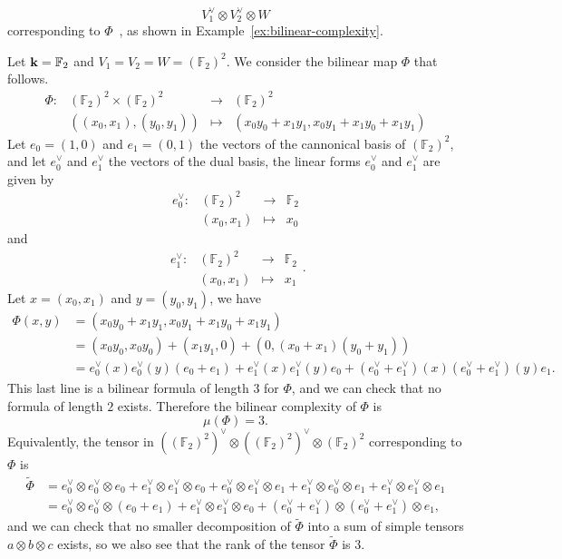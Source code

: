 \[
  V_1^\vee \otimes V_2^\vee \otimes W
\]
corresponding to $\Phi$~\cite{Randriam12}, as shown in Example~\ref{ex:bilinear-complexity}.
\begin{ex}
  \label{ex:bilinear-complexity}
  Let $\mathbf{k}=\mathbb{F}_2$ and $V_1=V_2=W=(\mathbb{F}_2)^2$. We consider the
  bilinear map $\Phi$ that follows.
\[
\begin{array}{llcl}
  \Phi:&(\mathbb{F}_2)^2\times (\mathbb{F}_{2})^2&\to&(\mathbb{F}_2)^2\\
  &((x_0, x_1), (y_0, y_1))&\mapsto&(x_0y_0+x_1y_1, x_0y_1+x_1y_0+x_1y_1)
\end{array}
\]
Let $e_0=(1,0)$ and $e_1=(0,1)$ the vectors of the cannonical basis of
$(\mathbb{F}_{2})^2$, and let $e_0^\vee$ and $e_1^\vee$ the vectors of the dual
basis, \ie the linear forms $e_0^\vee$ and $e_1^\vee$ are given by
\[
\begin{array}{llcl}
  e_0^\vee:&(\mathbb{F}_2)^2&\to&\mathbb{F}_2\\
  &(x_0, x_1)&\mapsto&x_0
\end{array}
\]
and
\[
\begin{array}{llcl}
  e_1^\vee:&(\mathbb{F}_2)^2&\to&\mathbb{F}_2\\
  &(x_0, x_1)&\mapsto&x_1
\end{array}.
\]
Let $x = (x_0, x_1)$ and $y = (y_0, y_1)$, we have 
\begin{align*}
  \Phi(x,y) &= (x_0y_0+x_1y_1, x_0y_1+x_1y_0+x_1y_1) \\
  &= (x_0y_0, x_0y_0)+(x_1y_1, 0)+(0, (x_0+x_1)(y_0+y_1)) \\
  &=
  e_0^\vee(x)e_0^\vee(y)(e_0+e_1)+e_1^\vee(x)e_1^\vee(y)e_0+(e_0^\vee+e_1^\vee)(x)(e_0^\vee+e_1^\vee)(y)e_1.
\end{align*}
This last line is a bilinear formula of length $3$ for $\Phi$, and we can check
that no formula of length $2$ exists. Therefore the bilinear complexity of
$\Phi$ is 
\[
  \mu(\Phi) = 3.
\]
Equivalently, the tensor in
$((\mathbb{F}_2)^2)^\vee\otimes((\mathbb{F}_2)^2)^\vee\otimes(\mathbb{F}_2)^2$
corresponding to $\Phi$ is
\begin{align*}
  \widetilde{\Phi} &= e_0^\vee\otimes e_0^\vee\otimes e_0 + e_1^\vee\otimes
  e_1^\vee\otimes e_0 + e_0^\vee\otimes e_1^\vee\otimes e_1 + e_1^\vee\otimes
  e_0^\vee\otimes e_1 + e_1^\vee\otimes e_1^\vee\otimes e_1 \\
  &= e_0^\vee\otimes e_0^\vee\otimes(e_0+e_1)+e_1^\vee\otimes
  e_1^\vee\otimes e_0+(e_0^\vee+e_1^\vee)\otimes (e_0^\vee+e_1^\vee)\otimes e_1,
\end{align*}
and we can check that no smaller decomposition of $\widetilde\Phi$ into a sum of simple
tensors $a\otimes b\otimes c$ exists,
so we also see that the rank of the tensor $\widetilde\Phi$ is $3$.
\end{ex}
